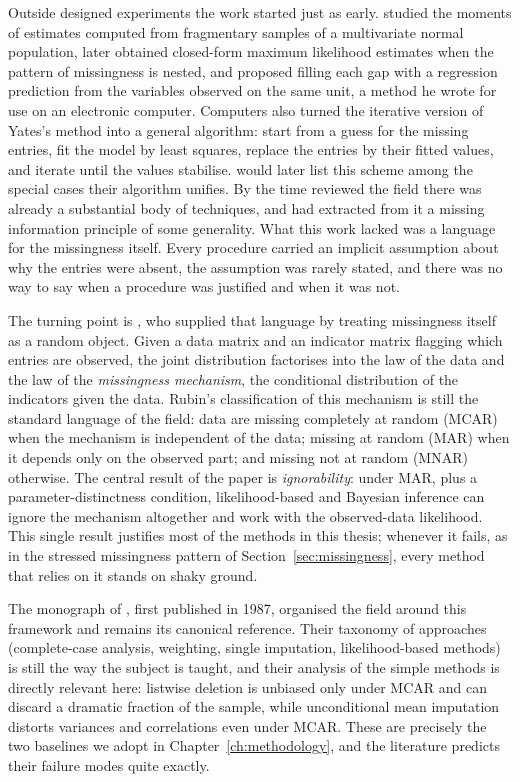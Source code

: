 Outside designed experiments the work started just as early.
\citet{wilks1932} studied the moments of estimates computed from
fragmentary samples of a multivariate normal population,
\citet{anderson1957} later obtained closed-form maximum likelihood
estimates when the pattern of missingness is nested, and \citet{buck1960}
proposed filling each gap with a regression prediction from the
variables observed on the same unit, a method he wrote for use on an
electronic computer. Computers also turned the iterative version of
Yates's method into a general algorithm: \citet{healy1956} start from
a guess for the missing entries, fit the model by least squares,
replace the entries by their fitted values, and iterate until the
values stabilise. \citet{dempster1977} would later list this scheme
among the special cases their algorithm unifies. By the time
\citet{afifi1966} reviewed the field there was already a substantial
body of techniques, and \citet{orchard1972} had extracted from it a
missing information principle of some generality. What this work
lacked was a language for the missingness itself. Every procedure
carried an implicit assumption about why the entries were absent, the
assumption was rarely stated, and there was no way to say when a
procedure was justified and when it was not.

The turning point is \citet{rubin1976}, who supplied that language by
treating missingness itself as a random object. Given a data matrix and
an indicator matrix flagging which entries are observed, the joint
distribution factorises into the law of the data and the law of the
\emph{missingness mechanism}, the conditional distribution of the
indicators given the data. Rubin's classification of this mechanism
is still the standard language of the field: data are missing
completely at random (MCAR) when the mechanism is independent of the
data; missing at random (MAR) when it depends only on the observed
part; and missing not at random (MNAR) otherwise. The central result
of the paper is \emph{ignorability}: under MAR, plus a
parameter-distinctness condition, likelihood-based and Bayesian
inference can ignore the mechanism altogether and work with the
observed-data likelihood. This single result justifies most of the
methods in this thesis; whenever it fails, as in the stressed
missingness pattern of Section~\ref{sec:missingness}, every method
that relies on it stands on shaky ground.

The monograph of \citet{little2019}, first published in 1987,
organised the field around this framework and remains its canonical
reference. Their taxonomy of approaches (complete-case analysis,
weighting, single imputation, likelihood-based methods) is still the
way the subject is taught, and their analysis of the simple methods is
directly relevant here: listwise deletion is unbiased only under MCAR
and can discard a dramatic fraction of the sample, while unconditional
mean imputation distorts variances and correlations even under MCAR.
These are precisely the two baselines we adopt in
Chapter~\ref{ch:methodology}, and the literature predicts their
failure modes quite exactly.

